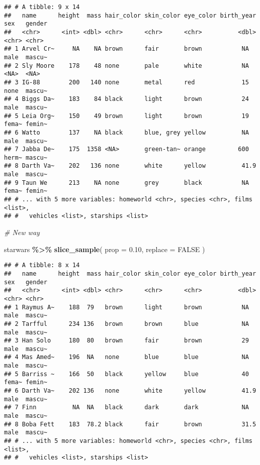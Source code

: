 \documentclass[
]{book}
\newenvironment{Shaded}{\begin{snugshade}}{\end{snugshade}}
\newcommand{\CommentTok}[1]{\textcolor[rgb]{0.56,0.35,0.01}{\textit{#1}}}
\newcommand{\DataTypeTok}[1]{\textcolor[rgb]{0.13,0.29,0.53}{#1}}
\newcommand{\FloatTok}[1]{\textcolor[rgb]{0.00,0.00,0.81}{#1}}
\newcommand{\KeywordTok}[1]{\textcolor[rgb]{0.13,0.29,0.53}{\textbf{#1}}}
\newcommand{\NormalTok}[1]{#1}
\newcommand{\OperatorTok}[1]{\textcolor[rgb]{0.81,0.36,0.00}{\textbf{#1}}}
\newcommand{\OtherTok}[1]{\textcolor[rgb]{0.56,0.35,0.01}{#1}}
\newcommand{\StringTok}[1]{\textcolor[rgb]{0.31,0.60,0.02}{#1}}
\begin{document}
\begin{verbatim}
## # A tibble: 9 x 14
##   name      height  mass hair_color skin_color eye_color birth_year sex   gender
##   <chr>      <int> <dbl> <chr>      <chr>      <chr>          <dbl> <chr> <chr> 
## 1 Arvel Cr~     NA    NA brown      fair       brown           NA   male  mascu~
## 2 Sly Moore    178    48 none       pale       white           NA   <NA>  <NA>  
## 3 IG-88        200   140 none       metal      red             15   none  mascu~
## 4 Biggs Da~    183    84 black      light      brown           24   male  mascu~
## 5 Leia Org~    150    49 brown      light      brown           19   fema~ femin~
## 6 Watto        137    NA black      blue, grey yellow          NA   male  mascu~
## 7 Jabba De~    175  1358 <NA>       green-tan~ orange         600   herm~ mascu~
## 8 Darth Va~    202   136 none       white      yellow          41.9 male  mascu~
## 9 Taun We      213    NA none       grey       black           NA   fema~ femin~
## # ... with 5 more variables: homeworld <chr>, species <chr>, films <list>,
## #   vehicles <list>, starships <list>
\end{verbatim}

\begin{Shaded}
\begin{Highlighting}[]
\CommentTok{\# New way}

\NormalTok{starwars }\OperatorTok{\%\textgreater{}\%}
\StringTok{  }\KeywordTok{slice\_sample}\NormalTok{(}
    \DataTypeTok{prop =} \FloatTok{0.10}\NormalTok{,}
    \DataTypeTok{replace =} \OtherTok{FALSE}
\NormalTok{  )}
\end{Highlighting}
\end{Shaded}

\begin{verbatim}
## # A tibble: 8 x 14
##   name      height  mass hair_color skin_color eye_color birth_year sex   gender
##   <chr>      <int> <dbl> <chr>      <chr>      <chr>          <dbl> <chr> <chr> 
## 1 Raymus A~    188  79   brown      light      brown           NA   male  mascu~
## 2 Tarfful      234 136   brown      brown      blue            NA   male  mascu~
## 3 Han Solo     180  80   brown      fair       brown           29   male  mascu~
## 4 Mas Amed~    196  NA   none       blue       blue            NA   male  mascu~
## 5 Barriss ~    166  50   black      yellow     blue            40   fema~ femin~
## 6 Darth Va~    202 136   none       white      yellow          41.9 male  mascu~
## 7 Finn          NA  NA   black      dark       dark            NA   male  mascu~
## 8 Boba Fett    183  78.2 black      fair       brown           31.5 male  mascu~
## # ... with 5 more variables: homeworld <chr>, species <chr>, films <list>,
## #   vehicles <list>, starships <list>
\end{verbatim}
\end{document}
